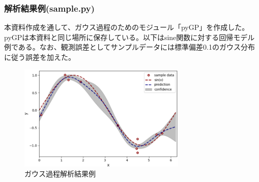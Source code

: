 \documentclass[dvipdfmx, 9pt, a4paper]{jsarticle}
\numberwithin{equation}{section}
\begin{document}
\subsubsection{解析結果例(sample.py)}
本資料作成を通して、ガウス過程のためのモジュール「pyGP」を作成した。pyGPは本資料と同じ場所に保存している。以下はsine関数に対する回帰モデル例である。なお、観測誤差としてサンプルデータには標準偏差0.1のガウス分布に従う誤差を加えた。

\begin{figure}[t]
\begin{center}
\includegraphics[width=8cm]{fig2.png}
\caption{ガウス過程解析結果例}
\end{center}
\end{figure}

\newpage
\end{document}
